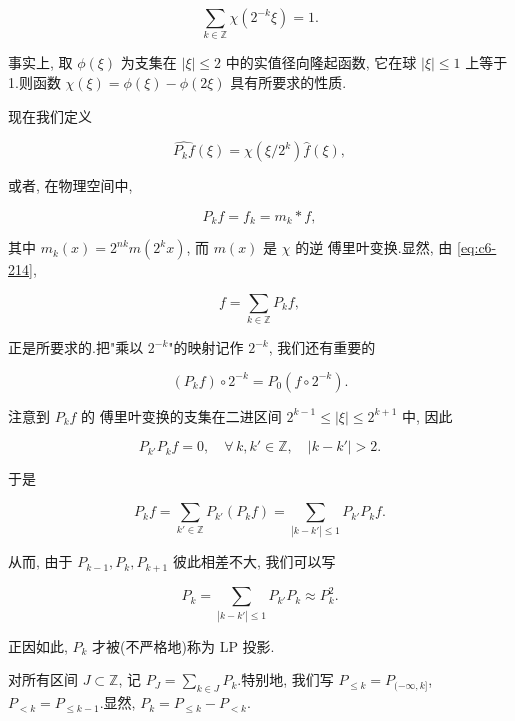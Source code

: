 \begin{equation}
\sum_{k\in\mathbb{Z}} \chi(2^{-k}\xi) = 1.\label{eq:c6-214}
\end{equation}

事实上, 取 $\phi(\xi)$ 为支集在 $|\xi| \leq 2$ 中的实值径向隆起函数, 它在球 $|\xi| \leq 1$ 上等于 1.则函数 $\chi(\xi) = \phi(\xi) - \phi(2\xi)$ 具有所要求的性质.

现在我们定义

\begin{equation}
\widehat{P_k f}(\xi) = \chi(\xi/2^k)\hat{f}(\xi), \label{eq:c6-215}
\end{equation}

或者, 在物理空间中,

\begin{equation}
P_k f = f_k = m_k * f, \label{eq:c6-216}
\end{equation}

其中 $m_k(x) = 2^{nk} m(2^k x)$, 而 $m(x)$ 是 $\chi$ 的逆 傅里叶变换.显然, 由 \eqref{eq:c6-214},

\begin{equation}
f = \sum_{k\in\mathbb{Z}} P_k f, \label{eq:c6-217}
\end{equation}

正是所要求的.把"乘以 $2^{-k}$"的映射记作 $2^{-k}$, 我们还有重要的

\begin{equation}
(P_k f) \circ 2^{-k} = P_0(f \circ 2^{-k}).\label{eq:c6-218}
\end{equation}

注意到 $P_k f$ 的 傅里叶变换的支集在二进区间 $2^{k-1} \leq |\xi| \leq 2^{k+1}$ 中, 因此

\[
P_{k'} P_k f = 0, \quad \forall\, k, k'\in\mathbb{Z}, \quad |k-k'| > 2.
\]

于是

\[
P_k f = \sum_{k'\in\mathbb{Z}} P_{k'}(P_k f) = \sum_{|k-k'|\leq 1} P_{k'} P_k f.
\]

从而, 由于 $P_{k-1}, P_k, P_{k+1}$ 彼此相差不大, 我们可以写

\[
P_k = \sum_{|k-k'|\leq 1} P_{k'} P_k \approx P_k^2.
\]

正因如此,  $P_k$ 才被(不严格地)称为 LP 投影.

对所有区间 $J \subset \mathbb{Z}$, 记 $P_J = \sum_{k\in J} P_k$.特别地, 我们写 $P_{\leq k} = P_{(-\infty, k]}$, $P_{<k} = P_{\leq k-1}$.显然, $P_k = P_{\leq k} - P_{<k}$.


